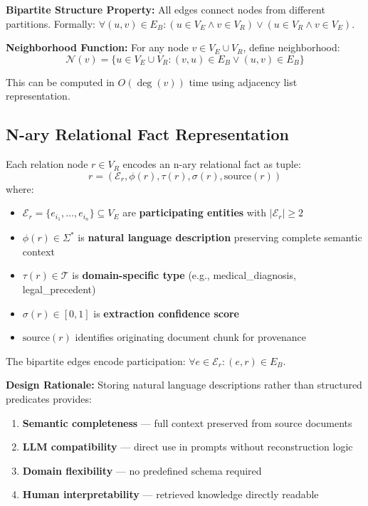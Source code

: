 \documentclass[11pt,a4paper]{article}
\begin{document}
\textbf{Bipartite Structure Property:} All edges connect nodes from different partitions. Formally: $\forall (u,v) \in E_B: (u \in V_E \land v \in V_R) \lor (u \in V_R \land v \in V_E)$.

\textbf{Neighborhood Function:} For any node $v \in V_E \cup V_R$, define neighborhood:
\begin{equation}
\mathcal{N}(v) = \{u \in V_E \cup V_R : (v,u) \in E_B \lor (u,v) \in E_B\}
\end{equation}

This can be computed in $O(\deg(v))$ time using adjacency list representation.

\subsection{N-ary Relational Fact Representation}

\begin{definition}
Each relation node $r \in V_R$ encodes an n-ary relational fact as tuple:
\begin{equation}
r = (\mathcal{E}_r, \phi(r), \tau(r), \sigma(r), \text{source}(r))
\end{equation}
where:
\begin{itemize}
    \item $\mathcal{E}_r = \{e_{i_1}, \ldots, e_{i_n}\} \subseteq V_E$ are \textbf{participating entities} with $|\mathcal{E}_r| \geq 2$
    \item $\phi(r) \in \Sigma^*$ is \textbf{natural language description} preserving complete semantic context
    \item $\tau(r) \in \mathcal{T}$ is \textbf{domain-specific type} (e.g., medical\_diagnosis, legal\_precedent)
    \item $\sigma(r) \in [0,1]$ is \textbf{extraction confidence score}
    \item $\text{source}(r)$ identifies originating document chunk for provenance
\end{itemize}
\end{definition}

The bipartite edges encode participation: $\forall e \in \mathcal{E}_r: (e,r) \in E_B$.

\textbf{Design Rationale:} Storing natural language descriptions rather than structured predicates provides:

\begin{enumerate}
    \item \textbf{Semantic completeness} --- full context preserved from source documents
    \item \textbf{LLM compatibility} --- direct use in prompts without reconstruction logic
    \item \textbf{Domain flexibility} --- no predefined schema required
    \item \textbf{Human interpretability} --- retrieved knowledge directly readable
\end{enumerate}
\end{document}
